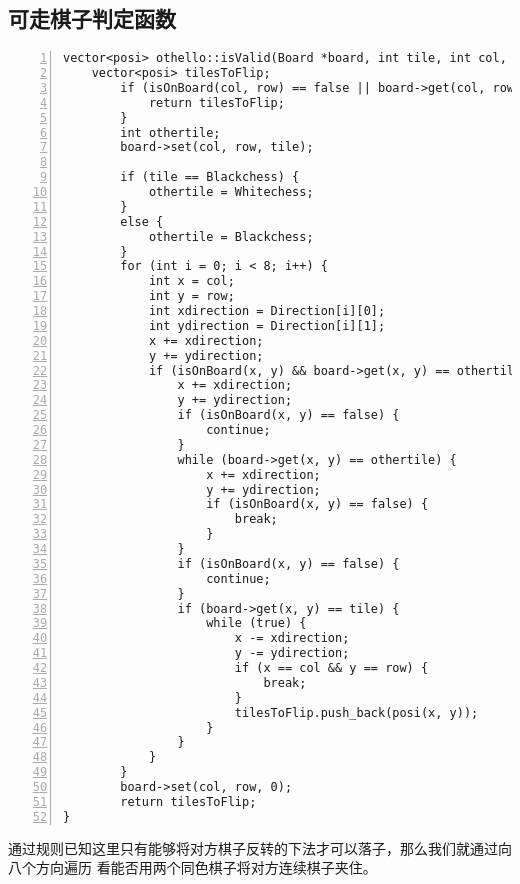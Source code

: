 \documentclass[UTF8]{ctexart}
\begin{document}
\subsection{可走棋子判定函数}
\begin{lstlisting}[language={[ANSI]C},numbers=left,numberstyle=\tiny,%frame=shadowbox,  
    rulesepcolor=\color{red!20!green!20!blue!20},  
    keywordstyle=\color{blue!70!black},  
    commentstyle=\color{blue!90!},  
    basicstyle=\ttfamily]  
vector<posi> othello::isValid(Board *board, int tile, int col, int row){
    vector<posi> tilesToFlip;
        if (isOnBoard(col, row) == false || board->get(col, row) != 0) {
            return tilesToFlip;
        }
        int othertile;
        board->set(col, row, tile);

        if (tile == Blackchess) {
            othertile = Whitechess;
        }
        else {
            othertile = Blackchess;
        }
        for (int i = 0; i < 8; i++) {
            int x = col;
            int y = row;
            int xdirection = Direction[i][0];
            int ydirection = Direction[i][1];
            x += xdirection;
            y += ydirection;
            if (isOnBoard(x, y) && board->get(x, y) == othertile) {
                x += xdirection;
                y += ydirection;
                if (isOnBoard(x, y) == false) {
                    continue;
                }
                while (board->get(x, y) == othertile) {
                    x += xdirection;
                    y += ydirection;
                    if (isOnBoard(x, y) == false) {
                        break;
                    }
                }
                if (isOnBoard(x, y) == false) {
                    continue;
                }
                if (board->get(x, y) == tile) {
                    while (true) {
                        x -= xdirection;
                        y -= ydirection;
                        if (x == col && y == row) {
                            break;
                        }
                        tilesToFlip.push_back(posi(x, y));
                    }
                }
            }
        }
        board->set(col, row, 0);
        return tilesToFlip;
}
\end{lstlisting} 
通过规则已知这里只有能够将对方棋子反转的下法才可以落子，那么我们就通过向八个方向遍历
看能否用两个同色棋子将对方连续棋子夹住。
\end{document}
